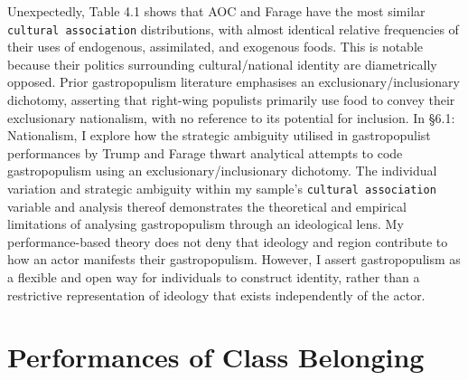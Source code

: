 \documentclass[a4paper, nobind]{templates/ociamthesis}
\begin{document}
Unexpectedly, Table 4.1 shows that AOC and Farage have the most similar \texttt{cultural\ association} distributions, with almost identical relative frequencies of their uses of endogenous, assimilated, and exogenous foods. This is notable because their politics surrounding cultural/national identity are diametrically opposed. Prior gastropopulism literature emphasises an exclusionary/inclusionary dichotomy, asserting that right-wing populists primarily use food to convey their exclusionary nationalism, with no reference to its potential for inclusion. In §6.1: Nationalism, I explore how the strategic ambiguity utilised in gastropopulist performances by Trump and Farage thwart analytical attempts to code gastropopulism using an exclusionary/inclusionary dichotomy. The individual variation and strategic ambiguity within my sample's \texttt{cultural\ association} variable and analysis thereof demonstrates the theoretical and empirical limitations of analysing gastropopulism through an ideological lens. My performance-based theory does not deny that ideology and region contribute to how an actor manifests their gastropopulism. However, I assert gastropopulism as a flexible and open way for individuals to construct identity, rather than a restrictive representation of ideology that exists independently of the actor.

\hypertarget{performances-of-class-belonging}{%
\section*{Performances of Class Belonging}\label{performances-of-class-belonging}}
\end{document}

